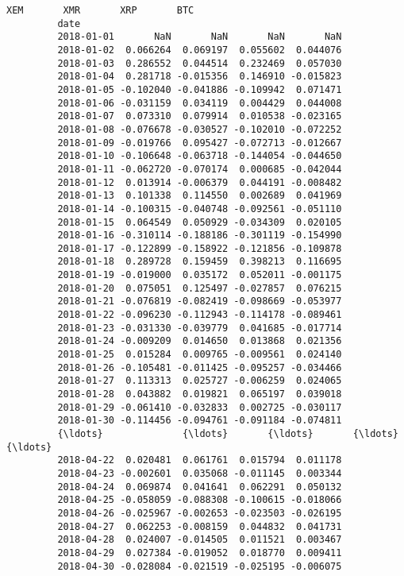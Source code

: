 \documentclass[11pt]{article}
\begin{document}
\begin{Verbatim}[commandchars=\\\{\}]
                          XEM       XMR       XRP       BTC  
         date                                                
         2018-01-01       NaN       NaN       NaN       NaN  
         2018-01-02  0.066264  0.069197  0.055602  0.044076  
         2018-01-03  0.286552  0.044514  0.232469  0.057030  
         2018-01-04  0.281718 -0.015356  0.146910 -0.015823  
         2018-01-05 -0.102040 -0.041886 -0.109942  0.071471  
         2018-01-06 -0.031159  0.034119  0.004429  0.044008  
         2018-01-07  0.073310  0.079914  0.010538 -0.023165  
         2018-01-08 -0.076678 -0.030527 -0.102010 -0.072252  
         2018-01-09 -0.019766  0.095427 -0.072713 -0.012667  
         2018-01-10 -0.106648 -0.063718 -0.144054 -0.044650  
         2018-01-11 -0.062720 -0.070174  0.000685 -0.042044  
         2018-01-12  0.013914 -0.006379  0.044191 -0.008482  
         2018-01-13  0.101338  0.114550  0.002689  0.041969  
         2018-01-14 -0.100315 -0.040748 -0.092561 -0.051110  
         2018-01-15  0.064549  0.050929 -0.034309  0.020105  
         2018-01-16 -0.310114 -0.188186 -0.301119 -0.154990  
         2018-01-17 -0.122899 -0.158922 -0.121856 -0.109878  
         2018-01-18  0.289728  0.159459  0.398213  0.116695  
         2018-01-19 -0.019000  0.035172  0.052011 -0.001175  
         2018-01-20  0.075051  0.125497 -0.027857  0.076215  
         2018-01-21 -0.076819 -0.082419 -0.098669 -0.053977  
         2018-01-22 -0.096230 -0.112943 -0.114178 -0.089461  
         2018-01-23 -0.031330 -0.039779  0.041685 -0.017714  
         2018-01-24 -0.009209  0.014650  0.013868  0.021356  
         2018-01-25  0.015284  0.009765 -0.009561  0.024140  
         2018-01-26 -0.105481 -0.011425 -0.095257 -0.034466  
         2018-01-27  0.113313  0.025727 -0.006259  0.024065  
         2018-01-28  0.043882  0.019821  0.065197  0.039018  
         2018-01-29 -0.061410 -0.032833  0.002725 -0.030117  
         2018-01-30 -0.114456 -0.094761 -0.091184 -0.074811  
         {\ldots}              {\ldots}       {\ldots}       {\ldots}       {\ldots}  
         2018-04-22  0.020481  0.061761  0.015794  0.011178  
         2018-04-23 -0.002601  0.035068 -0.011145  0.003344  
         2018-04-24  0.069874  0.041641  0.062291  0.050132  
         2018-04-25 -0.058059 -0.088308 -0.100615 -0.018066  
         2018-04-26 -0.025967 -0.002653 -0.023503 -0.026195  
         2018-04-27  0.062253 -0.008159  0.044832  0.041731  
         2018-04-28  0.024007 -0.014505  0.011521  0.003467  
         2018-04-29  0.027384 -0.019052  0.018770  0.009411  
         2018-04-30 -0.028084 -0.021519 -0.025195 -0.006075  

\end{Verbatim}
\end{document}
